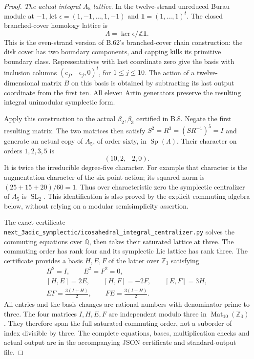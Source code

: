 \begin{proof}
\emph{The actual integral $A_5$ lattice.}
In the twelve-strand unreduced Burau module at $-1$,
let $\epsilon=(1,-1,\ldots,1,-1)$ and
$\mathbf1=(1,\ldots,1)^t$.
The closed branched-cover homology lattice is
\[
              \Lambda=\ker\epsilon/\mathbb Z\mathbf1.
                                                               \tag{B.64.3}
\]
This is the even-strand version of B.62's branched-cover
chain construction: the disk cover has two boundary
components, and capping kills its primitive boundary
class.  Representatives with last coordinate zero
give the basis with inclusion columns
$(e_j,-\epsilon_j,0)^t$, for $1\leq j\leq10$.
The action of a twelve-dimensional matrix $B$ on this
basis is obtained by subtracting its last output
coordinate from the first ten.
All eleven Artin generators preserve the resulting
integral unimodular symplectic form.

Apply this construction to the actual $\beta_2,\beta_3$
certified in B.8.  Negate the first resulting matrix.
The two matrices then satisfy
$S^2=R^3=(SR^{-1})^5=I$ and generate an actual copy
of $A_5$, of order sixty, in $\operatorname{Sp}(\Lambda)$.
Their character on orders $1,2,3,5$ is
\[
                         (10,2,-2,0).                       \tag{B.64.4}
\]
It is twice the irreducible degree-five character.
For example that character is the augmentation
character of the six-point action; its squared norm
is $(25+15+20)/60=1$.
Thus over characteristic zero the symplectic
centralizer of $A_5$ is $\operatorname{SL}_2$.
This identification is also proved by the explicit
commuting algebra below, without relying on a modular
semisimplicity assertion.

The exact certificate
\nolinkurl{next_3adic_symplectic/icosahedral_integral_centralizer.py}
solves the commuting equations over $\mathbb Q$, then
takes their saturated lattice at three.
The commuting order has rank four and its symplectic
Lie lattice has rank three.
The certificate provides a basis $H,E,F$ of the latter
over $\mathbb Z_3$ satisfying
\[
 \begin{gathered}
 H^2=I,\qquad E^2=F^2=0,\\
 [H,E]=2E,\qquad [H,F]=-2F,\qquad [E,F]=3H,\\
 EF=\frac{3(I+H)}2,\qquad FE=\frac{3(I-H)}2.
 \end{gathered}                                             \tag{B.64.5}
\]
All entries and the basis changes are rational numbers
with denominator prime to three.
The four matrices $I,H,E,F$ are independent modulo
three in $\operatorname{Mat}_{10}(\mathbb Z_3)$.
They therefore span the full saturated commuting
order, not a suborder of index divisible by three.
The complete equations, bases, multiplication checks
and actual output are in the accompanying JSON
certificate and standard-output file.


\end{proof}
